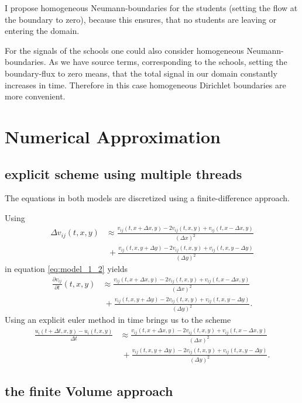 \documentclass[12pt,a4paper]{article}
\begin{document}
I propose homogeneous Neumann-boundaries for the students (setting the flow at the boundary to zero), because this ensures, that no students are leaving or entering the domain. 

For the signals of the schools one could also consider homogeneous Neumann-boundaries. As we have source terms, corresponding to the schools, setting the boundary-flux to zero means, that the total signal in our domain constantly increases in time. Therefore in this case homogeneous Dirichlet boundaries are more convenient.

\section{Numerical Approximation}

\subsection{explicit scheme using multiple threads}
The equations in both models are discretized using a finite-difference approach.

Using
\begin{align*}
\Delta v_{ij} (t,x,y) & \approx \frac{v_{ij}(t,x+\Delta x,y) - 2 v_{ij}(t,x,y) + v_{ij}(t,x - \Delta x,y)}{(\Delta x)^{2}} \\
&\ + \frac{v_{ij}(t,x,y +\Delta y) - 2 v_{ij}(t,x,y) + v_{ij}(t,x,y - \Delta y)}{(\Delta y)^{2}}
\end{align*}
in equation \eqref{eq:model_1_2} yields
\begin{align*}
\frac{\partial v_{ij}}{\partial t} (t,x,y) & \approx \frac{v_{ij}(t,x+\Delta x,y) - 2 v_{ij}(t,x,y) + v_{ij}(t,x - \Delta x,y)}{(\Delta x)^{2}} \\
&\ + \frac{v_{ij}(t,x,y +\Delta y) - 2 v_{ij}(t,x,y) + v_{ij}(t,x,y - \Delta y)}{(\Delta y)^{2}}.
\end{align*}
Using an explicit euler method in time brings us to the scheme
\begin{align*}
\frac{u_{i}(t+ \Delta t,x,y)-u_{i}(t,x,y)}{\Delta t} & \approx \frac{v_{ij}(t,x+\Delta x,y) - 2 v_{ij}(t,x,y) + v_{ij}(t,x - \Delta x,y)}{(\Delta x)^{2}} \\
&\ + \frac{v_{ij}(t,x,y +\Delta y) - 2 v_{ij}(t,x,y) + v_{ij}(t,x,y - \Delta y)}{(\Delta y)^{2}}.
\end{align*}

\subsection{the finite Volume approach}
\end{document}

